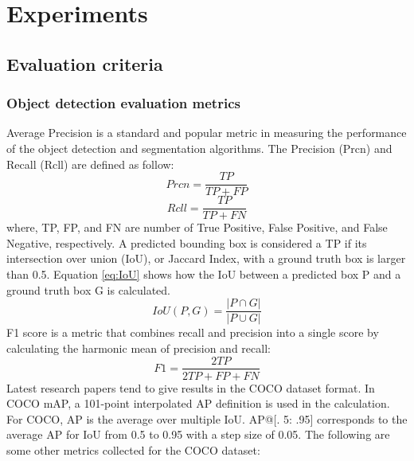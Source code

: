 \chapter{Experiments}\label{chap:exp}

\section{Evaluation criteria} \label{sec:evacri}
\subsection{Object detection evaluation metrics}
Average Precision is a standard and popular metric in measuring the performance of the object detection and segmentation algorithms. The Precision (Prcn) and Recall (Rcll) are defined as follow:
\begin{equation}
	Prcn = \frac{TP}{TP+FP}
\end{equation}
\begin{equation}
	Rcll = \frac{TP}{TP+FN}
\end{equation}
where, TP, FP, and FN are number of True Positive, False Positive, and False Negative, respectively. A predicted bounding box is considered a TP if its intersection over union (IoU), or Jaccard Index, with a ground truth box is larger than 0.5. Equation \ref{eq:IoU} shows how the IoU between a predicted box P and a ground truth box G is calculated.
\begin{equation}
	\label{eq:IoU}
	IoU(P,G) = \frac{|P\cap G|}{| P \cup G |}
\end{equation}
F1 score is a metric that combines recall and precision into a single score by calculating the harmonic mean of precision and recall:
\begin{equation}
	F1 = \frac{2TP}{2TP+FP+FN}
\end{equation}
Latest research papers tend to give results in the COCO dataset format. In COCO mAP, a 101-point interpolated AP definition is used in the calculation. For COCO, AP is the average over multiple IoU. AP@[. 5: .95] corresponds to the average AP for IoU from 0.5 to 0.95 with a step size of 0.05. The following are some other metrics collected for the COCO dataset:
